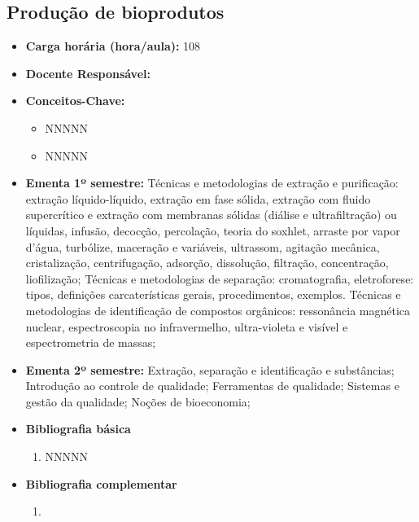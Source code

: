 \documentclass[11pt,fleqn]{book} %
\begin{document}
\subsection{Produção de bioprodutos}\label{disc:producao}
\begin{itemize}
	\item \textbf{Carga horária (hora/aula):} 108
	\item \textbf{Docente Responsável:}
	\item \textbf{Conceitos-Chave:}
	\begin{itemize}
		\item NNNNN
		\item NNNNN
	\end{itemize}
	\item \textbf{Ementa 1º semestre:}
	Técnicas e metodologias de extração e purificação: extração líquido-líquido, extração em fase sólida, extração com fluido supercrítico e extração com membranas sólidas (diálise e ultrafiltração) ou líquidas, infusão, decocção, percolação, teoria do soxhlet, arraste por vapor d’água, turbólize, maceração e variáveis, ultrassom, agitação mecânica, cristalização, centrifugação, adsorção, dissolução, filtração, concentração, liofilização; 
	Técnicas e metodologias de separação: cromatografia, eletroforese: tipos, definições carcaterísticas gerais, procedimentos, exemplos. 
	Técnicas e metodologias de identificação de compostos orgânicos: ressonância magnética nuclear, espectroscopia no infravermelho, ultra-violeta e visível e espectrometria de massas; 
	\item \textbf{Ementa 2º semestre:}
	Extração, separação e identificação e substâncias;
	Introdução ao controle de qualidade; 
	Ferramentas de qualidade; 
	Sistemas e gestão da qualidade;
	Noções de bioeconomia;
	\item \textbf{Bibliografia básica}
	\begin{enumerate}
		\item NNNNN
	\end{enumerate}
	\item \textbf{Bibliografia complementar}
	\begin{enumerate}
		\item 
	\end{enumerate}	
\end{itemize}


\newpage
\end{document}
